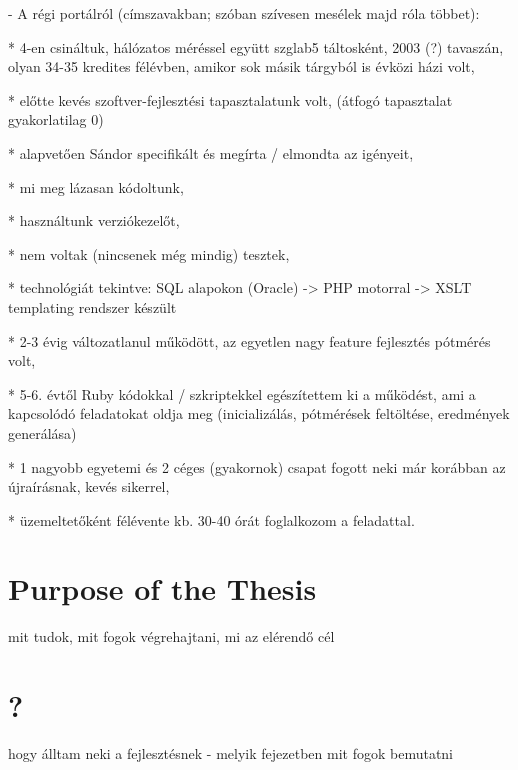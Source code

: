 - A régi portálról (címszavakban; szóban szívesen mesélek majd róla többet):

* 4-en csináltuk, hálózatos méréssel együtt szglab5 táltosként, 2003
(?) tavaszán, olyan 34-35 kredites félévben, amikor sok másik tárgyból
is évközi házi volt,

* előtte kevés szoftver-fejlesztési tapasztalatunk volt, (átfogó
tapasztalat gyakorlatilag 0)

* alapvetően Sándor specifikált és megírta / elmondta az igényeit,

* mi meg lázasan kódoltunk,

* használtunk verziókezelőt,

* nem voltak (nincsenek még mindig) tesztek,

* technológiát tekintve: SQL alapokon (Oracle) -> PHP motorral -> XSLT
templating rendszer készült

* 2-3 évig változatlanul működött, az egyetlen nagy feature fejlesztés
pótmérés volt,

* 5-6. évtől Ruby kódokkal / szkriptekkel egészítettem ki a működést,
ami a kapcsolódó feladatokat oldja meg (inicializálás, pótmérések
feltöltése, eredmények generálása)

* 1 nagyobb egyetemi és 2 céges (gyakornok) csapat fogott neki már
korábban az újraírásnak, kevés sikerrel,

* üzemeltetőként félévente kb. 30-40 órát foglalkozom a feladattal.


\section{Purpose of the Thesis}
mit tudok, mit fogok végrehajtani, mi az elérendő cél

\section{?}
hogy álltam neki a fejlesztésnek - melyik fejezetben mit fogok bemutatni